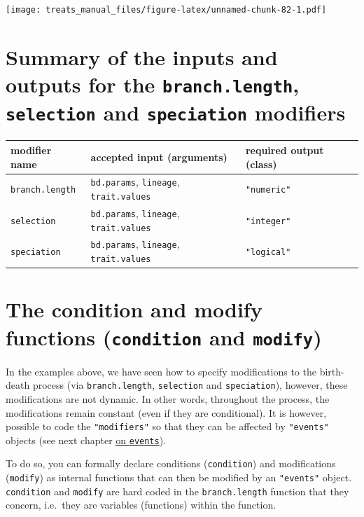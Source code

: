 \documentclass[
]{book}
\begin{document}
\texttt{[image: treats\_manual\_files/figure-latex/unnamed-chunk-82-1.pdf]}

\hypertarget{summarymodifiers}{%
\section{\texorpdfstring{Summary of the inputs and outputs for the \texttt{branch.length}, \texttt{selection} and \texttt{speciation} modifiers}{Summary of the inputs and outputs for the branch.length, selection and speciation modifiers}}\label{summarymodifiers}}

\begin{longtable}[]{@{}lll@{}}
\toprule
modifier name & accepted input (arguments) & required output (class)\tabularnewline
\midrule
\endhead
\texttt{branch.length} & \texttt{bd.params}, \texttt{lineage}, \texttt{trait.values} & \texttt{"numeric"}\tabularnewline
\texttt{selection} & \texttt{bd.params}, \texttt{lineage}, \texttt{trait.values} & \texttt{"integer"}\tabularnewline
\texttt{speciation} & \texttt{bd.params}, \texttt{lineage}, \texttt{trait.values} & \texttt{"logical"}\tabularnewline
\bottomrule
\end{longtable}

\hypertarget{the-condition-and-modify-functions-condition-and-modify}{%
\section{\texorpdfstring{The condition and modify functions (\texttt{condition} and \texttt{modify})}{The condition and modify functions (condition and modify)}}\label{the-condition-and-modify-functions-condition-and-modify}}

In the examples above, we have seen how to specify modifications to the birth-death process (via \texttt{branch.length}, \texttt{selection} and \texttt{speciation}), however, these modifications are not dynamic.
In other words, throughout the process, the modifications remain constant (even if they are conditional).
It is however, possible to code the \texttt{"modifiers"} so that they can be affected by \texttt{"events"} objects (see next chapter \protect\hyperlink{makeevents}{on \texttt{events}}).

To do so, you can formally declare conditions (\texttt{condition}) and modifications (\texttt{modify}) as internal functions that can then be modified by an \texttt{"events"} object.
\texttt{condition} and \texttt{modify} are hard coded in the \texttt{branch.length} function that they concern, i.e.~they are variables (functions) within the function.
\end{document}
